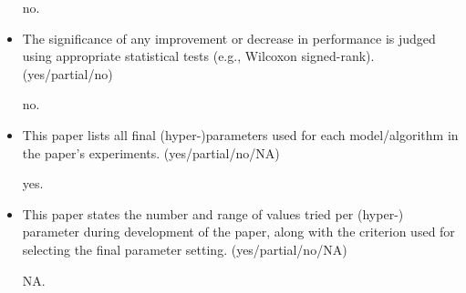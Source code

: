 \begin{itemize}
no.

\item The significance of any improvement or decrease in performance is judged using appropriate statistical tests (e.g., Wilcoxon signed-rank). (yes/partial/no)

no.

\item This paper lists all final (hyper-)parameters used for each model/algorithm in the paper’s experiments. (yes/partial/no/NA)

yes.

\item This paper states the number and range of values tried per (hyper-) parameter during development of the paper, along with the criterion used for selecting the final parameter setting. (yes/partial/no/NA)

NA.

\end{itemize}
